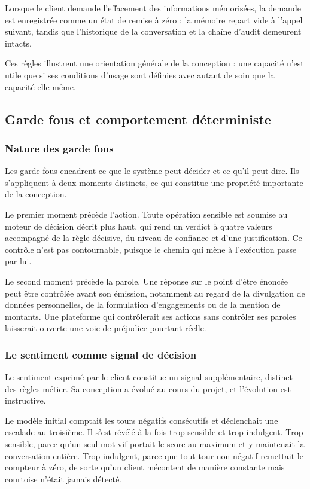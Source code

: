 Lorsque le client demande l'effacement des informations mémorisées, la demande est enregistrée comme un état de remise à zéro : la mémoire repart vide à l'appel suivant, tandis que l'historique de la conversation et la chaîne d'audit demeurent intacts.

Ces règles illustrent une orientation générale de la conception : une capacité n'est utile que si ses conditions d'usage sont définies avec autant de soin que la capacité elle même.

\subsection{Garde fous et comportement déterministe}

\subsubsection{Nature des garde fous}

Les garde fous encadrent ce que le système peut décider et ce qu'il peut dire. Ils s'appliquent à deux moments distincts, ce qui constitue une propriété importante de la conception.

Le premier moment précède l'action. Toute opération sensible est soumise au moteur de décision décrit plus haut, qui rend un verdict à quatre valeurs accompagné de la règle décisive, du niveau de confiance et d'une justification. Ce contrôle n'est pas contournable, puisque le chemin qui mène à l'exécution passe par lui.

Le second moment précède la parole. Une réponse sur le point d'être énoncée peut être contrôlée avant son émission, notamment au regard de la divulgation de données personnelles, de la formulation d'engagements ou de la mention de montants. Une plateforme qui contrôlerait ses actions sans contrôler ses paroles laisserait ouverte une voie de préjudice pourtant réelle.

\subsubsection{Le sentiment comme signal de décision}

Le sentiment exprimé par le client constitue un signal supplémentaire, distinct des règles métier. Sa conception a évolué au cours du projet, et l'évolution est instructive.

Le modèle initial comptait les tours négatifs consécutifs et déclenchait une escalade au troisième. Il s'est révélé à la fois trop sensible et trop indulgent. Trop sensible, parce qu'un seul mot vif portait le score au maximum et y maintenait la conversation entière. Trop indulgent, parce que tout tour non négatif remettait le compteur à zéro, de sorte qu'un client mécontent de manière constante mais courtoise n'était jamais détecté.

